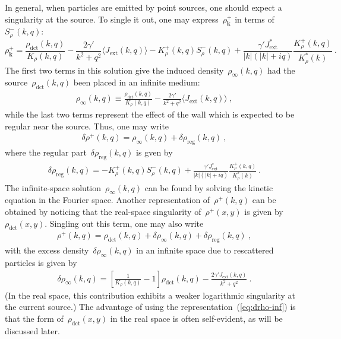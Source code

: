 \documentclass[preprint,aps,eqsecnum, prb]{revtex4-1}
\newcommand{\fplus}[1]{{#1}^{+}}
\newcommand{\fminus}[1]{{#1}^{-}}
\newcommand{\dct}[1]{{#1}_\mathrm{dct}}
\begin{document}
In general, when particles
are emitted by point sources, one should expect a singularity
at the source. To single it out,
one may express~$\fplus{\rho}_{\bm k}$
in terms of~$\fminus{S}_\rho(k, q)$:
\begin{equation}
  \label{eq:solution-rho-plus}
  \fplus{\rho}_{\bm k} = \frac{\dct{\rho}(k, q)}{K_\rho(k, q)}
    - \frac{2 \gamma'}{k^2 + q^2} \langle J_\mathrm{ext}(k, q) \rangle
  - \fplus{K}_\rho(k, q) \fminus{S}_\rho(k, q)
  + \frac{\gamma' J_\mathrm{ext}^\ast}{|k|(|k| + iq)}
     \frac{\fplus{K}_\rho(k, q)}{K_\rho^\ast(k)}
  \  .
\end{equation}
The first two terms in this solution give the induced
density~$\rho_\infty(k, q)$  had the source~$\dct{\rho}(k, q)$
been placed in an infinite medium:
\begin{align}
\rho_\infty(k, q) \equiv \frac{\dct{\rho}(k, q)}{K_\rho(k, q)}
- \frac{2\gamma'}{k^2 + q^2} \langle J_\mathrm{ext}(k, q)\rangle\ ,
\end{align}
 while the last two terms represent
the effect of the wall which is expected to be regular near the source.
Thus, one may write
\begin{align}
  \delta\fplus{\rho}(k, q) = \rho_{\infty}(k, q) + \delta\rho_\mathrm{reg}(k, q)
  \ ,
\end{align}
where the regular part~$\delta\rho_\mathrm{reg}(k, q)$ is gven by
\begin{align}
  \label{eq:rho-reg}
 \delta\rho_\mathrm{reg}(k, q) =
  - \fplus{K}_\rho(k, q)
\fminus{S}_\rho(k, q) + \frac{\gamma'J_\mathrm{ext}^\ast}{|k|(|k| + iq)}
\frac{\fplus{K}_\rho(k, q)}{K_\rho^\ast(k)}\ .
\end{align}
The infinite-space solution~$\rho_\infty(k, q)$ can be found
by solving the kinetic equation in the Fourier space.
Another representation of~$\fplus{\rho}(k, q)$ can be obtained by noticing that
the real-space singularity of~$\fplus{\rho}(x, y)$ is given by
$\dct{\rho}(x, y)$. Singling out this term, one may also write
\begin{align}
  \label{eq:rho-decomp}
\fplus{\rho}(k, q) = \dct{\rho}(k, q)
 + \delta \rho_\infty(k, q) + \delta\rho_\mathrm{reg}(k, q)\ ,
\end{align}
with the excess density~$\delta\rho_\infty(k, q)$ in an infinite space
due to rescattered particles is given by
\begin{align}
  \label{eq:drho-inf}
\delta\rho_\infty(k, q) = \left[\frac{1}{K_\rho(k, q)} - 1\right]
\dct{\rho}(k, q)
- \frac{2\gamma' J_\mathrm{ext}(k, q)}{k^2 + q^2}\ .
\end{align}
(In the real space, this contribution exhibits a weaker logarithmic
singularity at the current source.)
The advantage of using the representation~(\ref{eq:drho-inf})
is that the form of~$\dct{\rho}(x, y)$ in the real space
is often self-evident, as will be discussed later.
\end{document}
